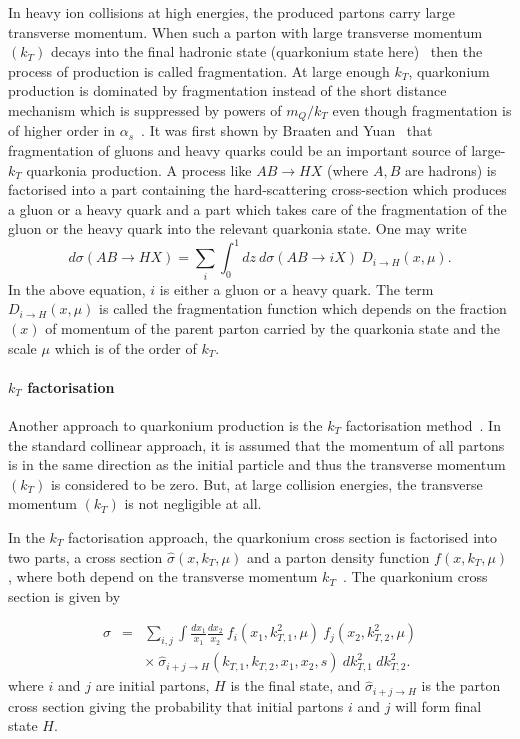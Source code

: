 In heavy ion collisions at high energies, the produced partons
carry large transverse momentum.
When such a parton  with large transverse momentum $(k_T)$ decays into the final
hadronic state (quarkonium state here)~\cite{frag} then the process of production is called
fragmentation. At large enough $k_T$, quarkonium production is dominated by
fragmentation instead of the short distance mechanism which 
is suppressed by powers of $m_Q/k_T$ even though fragmentation is of higher
order in $\alpha_s$~\cite{frag}. 
It was first shown by Braaten and Yuan~\cite{frag,frag1} that fragmentation of
gluons and heavy quarks
 could be an important source of large-$k_T$ quarkonia production.
 A process like $A  B \rightarrow H  X$ (where $A,B$ are  hadrons)
is factorised  into a part containing the hard-scattering cross-section which produces
 a gluon or a heavy quark 
and a part which takes care of the fragmentation of the gluon or the heavy quark into the
relevant quarkonia state. One may write 
\begin{equation}
d\sigma (A  B \rightarrow H X) = \sum_i \int_0^1 dz \ d\sigma  (A  B \rightarrow i  X) \ D_{i \rightarrow H} (x,\mu).
\end{equation}
In the above equation, $i$ is either a gluon or a heavy quark. The term $D_{i \rightarrow H} (x,\mu)$ 
is called the fragmentation function which depends on the fraction $(x)$ of momentum of the parent
parton carried by the quarkonia state and the scale $\mu$ which is of the order of $k_T$. 

\paragraph{$k_T$ factorisation}

Another approach to quarkonium production is the $k_T$ factorisation method~\cite{kt1,kt2}.
In the  standard collinear approach, it is assumed that the momentum of all partons is
in the same direction as the initial particle and thus the  transverse momentum $(k_T)$ is
considered to be zero. But, at large collision energies, the transverse
momentum $(k_T)$ is not negligible at all. 
 
In the $k_T$ factorisation approach, the quarkonium cross section is factorised
into two parts,  a cross section ${\hat \sigma} (x, k_T, \mu)$ and a parton
density function $f(x, k_T, \mu)$, where both depend on the transverse
momentum $k_T$~\cite{kt3}.  The quarkonium cross section is given by 
 
\begin{eqnarray}
   \sigma &=& \sum_{i,j} \int \frac {dx_1}{x_1} \frac {dx_2}{x_2} \
            f_i (x_1, k_{T,1}^2, \mu) \  f_j (x_2, k_{T,2}^2, \mu) \nonumber \\
    && \times \ {\hat \sigma}_{i+j \rightarrow H} (k_{T,1}, k_{T,2}, x_1, x_2, s) \ dk^2_{T,1} \ dk^2_{T,2}.
\end{eqnarray}
where $i$ and $j$ are initial partons, $H$ is the final state,
 and ${\hat \sigma}_{i+j \rightarrow H}$ is the parton cross
section giving the probability that initial partons $i$ and $j$ will form final state $H$.
